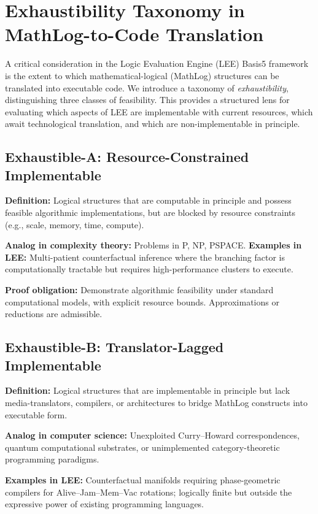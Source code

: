 \section{Exhaustibility Taxonomy in MathLog-to-Code Translation}

A critical consideration in the Logic Evaluation Engine (LEE) Basis5 framework is the extent to which 
mathematical-logical (MathLog) structures can be translated into executable code. 
We introduce a taxonomy of \emph{exhaustibility}, distinguishing three classes of feasibility. 
This provides a structured lens for evaluating which aspects of LEE are implementable with 
current resources, which await technological translation, and which are non-implementable in principle.

\subsection{Exhaustible-A: Resource-Constrained Implementable}
\textbf{Definition:} Logical structures that are computable in principle and 
possess feasible algorithmic implementations, but are blocked by resource constraints 
(e.g., scale, memory, time, compute). 

\textbf{Analog in complexity theory:} Problems in P, NP, PSPACE.  
\textbf{Examples in LEE:} Multi-patient counterfactual inference where the branching factor 
is computationally tractable but requires high-performance clusters to execute.  

\textbf{Proof obligation:} Demonstrate algorithmic feasibility under standard computational models, 
with explicit resource bounds. Approximations or reductions are admissible.  

\subsection{Exhaustible-B: Translator-Lagged Implementable}
\textbf{Definition:} Logical structures that are implementable in principle but lack 
media-translators, compilers, or architectures to bridge MathLog constructs into executable form.  

\textbf{Analog in computer science:} Unexploited Curry--Howard correspondences, 
quantum computational substrates, or unimplemented category-theoretic programming paradigms.  

\textbf{Examples in LEE:} Counterfactual manifolds requiring phase-geometric compilers 
for Alive--Jam--Mem--Vac rotations; logically finite but outside the expressive power 
of existing programming languages.  

